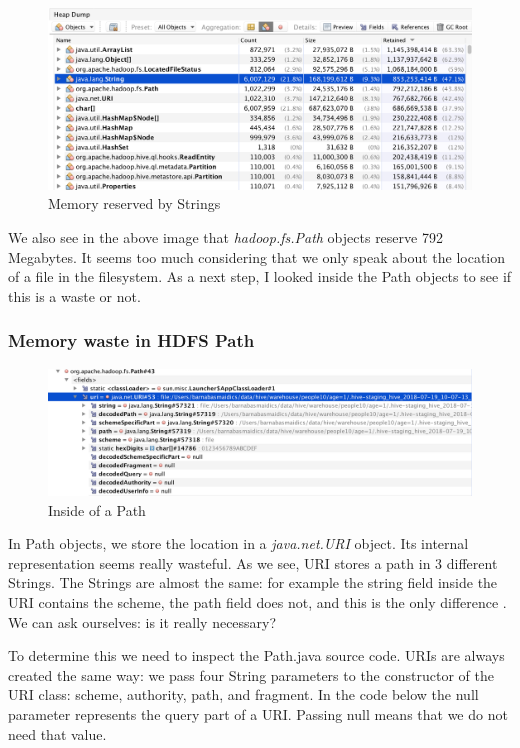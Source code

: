 \begin{figure}[H]
	\includegraphics[width=150mm, keepaspectratio]{figures/string_memory.png}
	\centering
	\caption{Memory reserved by Strings}
\end{figure}

We also see in the above image that \textit{hadoop.fs.Path} objects reserve 792 Megabytes. It seems too much considering that we only speak about the location of a file in the filesystem. As a next step, I looked inside the Path objects to see if this is a waste or not.

\subsubsection{Memory waste in HDFS Path}
\begin{figure}[H]
	\includegraphics[width=150mm, keepaspectratio]{figures/path_memory.png}
	\centering
	\caption{Inside of a Path}
\end{figure}

In Path objects, we store the location in a \textit{java.net.URI} object. Its internal representation seems really wasteful. As we see, URI stores a path in 3 different Strings. The Strings are almost the same: for example the string field inside the URI contains the scheme, the path field does not, and this is the only difference \etc. We can ask ourselves: is it really necessary?

To determine this we need to inspect the Path.java source code. URIs are always created the same way: we pass four String parameters to the constructor of the URI class: scheme, authority, path, and fragment. In the code below the null parameter represents the query part of a URI. Passing null means that we do not need that value.

